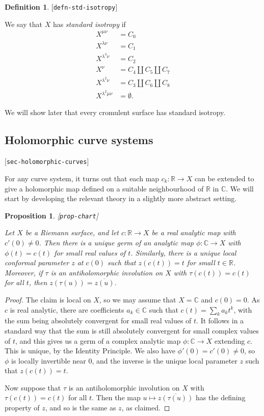 \documentclass[reqno]{amsart}
\newcommand{\lbl}[1]{\label{#1}\textup{[\texttt{#1}]}\par}
\newcommand{\lbl}{\label}
\newcommand{\lm}        {\lambda}
\newcommand{\R}         {{\mathbb{R}}}
\newcommand{\C}         {{\mathbb{C}}}
\newcommand{\ov}[1]     {\overline{#1}}
\renewcommand{\:}{\colon}
\newtheorem{proposition}[theorem]{Proposition}
\theoremstyle{definition}
\newtheorem{definition}[theorem]{Definition}
\begin{document}
\begin{definition}\lbl{defn-std-isotropy}
 We say that $X$ has \emph{standard isotropy} if
 \begin{align*}
  X^{\mu\nu} &= C_0 \\
  X^{\lm\nu} &= C_1 \\
  X^{\lm^3\nu} &= C_2 \\
  X^{\nu} &= C_4\amalg C_5 \amalg C_7 \\
  X^{\lm^2\nu} &= C_3\amalg C_6 \amalg C_8 \\
  X^{\lm^2\mu\nu} &= \emptyset.
 \end{align*}
\end{definition}
We will show later that every cromulent surface has standard
isotropy.

\subsection{Holomorphic curve systems}
\lbl{sec-holomorphic-curves}

For any curve system, it turns out that each map $c_k\:\R\to X$ can be
extended to give a holomorphic map defined on a suitable neighbourhood
of $\R$ in $\C$.  We will start by developing the relevant theory in a
slightly more abstract setting.

\begin{proposition}\lbl{prop-chart}
 Let $X$ be a Riemann surface, and let $c\:\R\to X$ be a real analytic
 map with $c'(0)\neq 0$.  Then there is a unique germ of an analytic
 map $\phi\:\C\to X$ with $\phi(t)=c(t)$ for small real values of
 $t$.  Similarly, there is a unique local conformal
 parameter $z$ at $c(0)$ such that $z(c(t))=t$ for small $t\in\R$.
 Moreover, if $\tau$ is an antiholomorphic involution on $X$ with
 $\tau(c(t))=c(t)$ for all $t$, then $z(\tau(u))=\ov{z(u)}$.
\end{proposition}
\begin{proof}
 The claim is local on $X$, so we may assume that $X=\C$ and
 $c(0)=0$.  As $c$ is real analytic, there are coefficients $a_k\in\C$
 such that $c(t)=\sum_ka_kt^k$, with the sum being absolutely
 convergent for small real values of $t$.  It follows in a standard
 way that the sum is still absolutely convergent for small complex
 values of $t$, and this gives us a germ of a complex analytic map
 $\phi\:\C\to X$ extending $c$.  This is unique, by the Identity
 Principle.  We also have $\phi'(0)=c'(0)\neq 0$, so $\phi$ is locally
 invertible near $0$, and the inverse is the unique local parameter
 $z$ such that $z(c(t))=t$.

 Now suppose that $\tau$ is an antiholomorphic involution on $X$ with
 $\tau(c(t))=c(t)$ for all $t$.  Then the map
 $u\mapsto\ov{z(\tau(u))}$ has the defining property of $z$, and so is
 the same as $z$, as claimed.
\end{proof}
\end{document}
